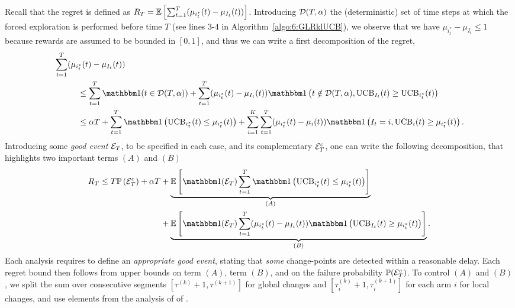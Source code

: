 Recall that the regret is defined as $R_T = \mathbb{E}\left[\sum_{t=1}^T(\mu_{i^*_t}(t) - \mu_{I_t}(t))\right]$.
Introducing $\mathcal{D}(T,\alpha)$ the (deterministic) set of time steps at which the forced exploration is performed before time $T$ (see lines $3$-$4$ in Algorithm~\ref{algo:6:GLRklUCB}),
we observe that we have $\mu_{i^*_t} - \mu_{I_t} \leq 1$ because rewards are assumed to be bounded in $[0,1]$,
and thus we can write a first decomposition of the regret,
\begin{align*}
 & \sum_{t=1}^T (\mu_{i^*_t}(t) - \mu_{I_t}(t)) \\
 & \hspace{1cm} \leq  \sum_{t=1}^{T} \indic(t \in \cD(T,\alpha)) + \sum_{t=1}^T (\mu_{i^*_t}(t) - \mu_{I_t}(t))\indic\left(t \notin\cD(T,\alpha), \UCB_{I_t}(t) \geq \UCB_{i^*_t}(t)\right) \\
 & \hspace{1cm}\leq  \alpha T + \sum_{t=1}^T \indic\left(\UCB_{i^*_t}(t) \leq \mu_{i^*_t}(t)\right) + \sum_{i=1}^K\sum_{t=1}^T (\mu_{i^*_t}(t) - \mu_{i}(t))\indic\left(I_t = i, \UCB_{i}(t) \geq \mu_{i^*_t}(t)\right).
\end{align*}
%
Introducing some \emph{good event} $\mathcal{E}_T$, to be specified in each case, and its complementary $\mathcal{E}_T^c$, one can write the following decomposition, that highlights two important terms $(A)$ and $(B)$
%
\begin{align}\label{eq:6:GeneRegretBound}
    R_T \leq T \bP\left(\cE_T^c\right) + \alpha T & + \underbrace{\bE\left[\indic(\cE_T) \sum_{t=1}^T \indic\left(\UCB_{i^*_t}(t) \leq \mu_{i^*_t}(t)\right)\right]}_{(A)} \\
    & + \underbrace{\bE\left[\indic(\cE_T)\sum_{t=1}^T (\mu_{i^*_t}(t) - \mu_{I_t}(t))\indic\left(\UCB_{I_t}(t) \geq \mu_{i^*_t}(t)\right)\right]}_{(B)}. \nonumber
\end{align}
%
Each analysis requires to define an \emph{appropriate good event}, stating that \emph{some} change-points are detected within a reasonable delay. Each regret bound then follows from upper bounds on term $(A)$, term $(B)$, and on the failure probability $\mathbb{P}(\mathcal{E}_T^c)$.
%
To control $(A)$ and $(B)$, we split the sum over consecutive segments $[\tau^{(k)}+1, \tau^{(k+1)}]$ for global changes and $[\tau^{(k)}_i+1, \tau^{(k+1)}_i]$ for each arm $i$ for local changes, and use elements from the analysis of \klUCB{} of \cite{KLUCBJournal}.

